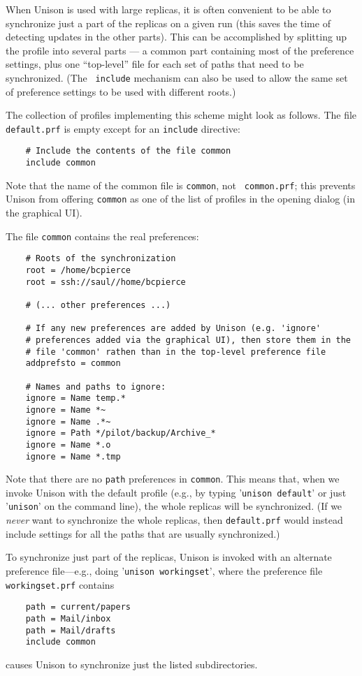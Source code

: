 \documentclass{article}
\begin{document}

When Unison is used with large replicas, it is often convenient to be
able to synchronize just a part of the replicas on a given run (this
saves the time of detecting updates in the other parts).  This can be
accomplished by splitting up the profile into several parts --- a common
part containing most of the preference settings, plus one ``top-level''
file for each set of paths that need to be synchronized.  (The {\tt
  include} mechanism can also be used to allow the same set of preference
settings to be used with different roots.)

The collection
of profiles implementing this scheme might look as follows.
%
The file {\tt default.prf} is empty except for an {\tt include}
directive:
\begin{verbatim}
    # Include the contents of the file common
    include common
\end{verbatim}
Note that the name of the common file is {\tt common}, not {\tt
  common.prf}; this prevents Unison from offering {\tt common} as one of
the list of profiles in the opening dialog (in the graphical UI).

The file {\tt common} contains the real preferences:
\begin{verbatim}
    # Roots of the synchronization
    root = /home/bcpierce
    root = ssh://saul//home/bcpierce

    # (... other preferences ...)

    # If any new preferences are added by Unison (e.g. 'ignore'
    # preferences added via the graphical UI), then store them in the
    # file 'common' rathen than in the top-level preference file
    addprefsto = common

    # Names and paths to ignore:
    ignore = Name temp.*
    ignore = Name *~
    ignore = Name .*~
    ignore = Path */pilot/backup/Archive_*
    ignore = Name *.o
    ignore = Name *.tmp
\end{verbatim}
Note that there are no {\tt path} preferences in {\tt common}.  This
means that, when we invoke Unison with the default profile (e.g., by
typing '{\tt unison default}' or just '{\tt unison}' on the command
line), the whole replicas will be synchronized.  (If we {\em never} want
to synchronize the whole replicas, then {\tt default.prf} would instead
include settings for all the paths that are usually synchronized.)

To synchronize just part of the replicas, Unison is invoked with an
alternate preference file---e.g., doing '{\tt unison workingset}', where the
preference file {\tt workingset.prf} contains
\begin{verbatim}
    path = current/papers
    path = Mail/inbox
    path = Mail/drafts
    include common
\end{verbatim}
causes Unison to synchronize just the listed subdirectories.
\end{document}
